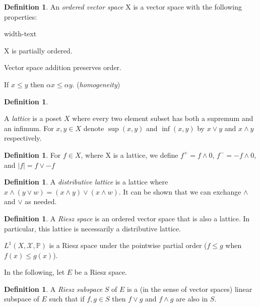 \documentclass[letterpaper,10pt,oneside,onecolumn,reqno]{amsart}
\renewcommand{\P}{\mathbb P}
\newcommand{\X}{\mathcal X}
\theoremstyle{definition}
\newtheorem{defn}[thm]{Definition}
\newcommand{\meet}{\wedge}
\newcommand{\join}{\vee}
\begin{document}
\begin{defn}\label{def:3}
An \emph{ordered vector space} X is a vector space with the following properties:

\begin{deflist}{width-text}
\item X is partially ordered.
\item Vector space addition preserves order.
\item If $x \leq y$ then $\alpha x \leq \alpha y$. (\emph{homogeneity})
\end{deflist}
\end{defn}

\begin{defn}\label{def:4}

A \emph{lattice} is a poset $X$ where every two element subset has both a supremum and an infimum. For $x, y \in X$ denote $\sup(x,y)$ and $\inf(x,y)$ by $x \join y$ and $x \meet y$ respectively. 
\end{defn}

\begin{defn}\label{def:5}
For $f \in X$, where X is a lattice, we define $f^+=f \meet 0$, $f^-=-f \meet 0$, and $|f| = f \join -f$
\end{defn}

\begin{defn}\label{def:6}
A \emph{distributive lattice} is a lattice where $x \meet (y \join w) = (x \meet y) \join (x \meet w)$. It can be shown that we can exchange $\meet$ and $\join$ as needed.
\end{defn}

\begin{defn}\label{def:7}
  A \emph{Riesz space} is an ordered vector space that is also a lattice. In particular, this lattice is necessarily a distributive lattice.

$L^1(X,\X,\P)$ is a Riesz space under the pointwise partial order ($f \leq g$ when $f(x) \leq g(x)$).

\end{defn}
In the following, let $E$ be a Riesz space.

\begin{defn}\label{def:8}
A \emph{Riesz subspace} $S$ of $E$ is a (in the sense of vector spaces) linear subspace of $E$ such that if $f,g \in S$ then $f \join g$ and $f \meet g$ are also in $S$.
\end{defn}
\end{document}
